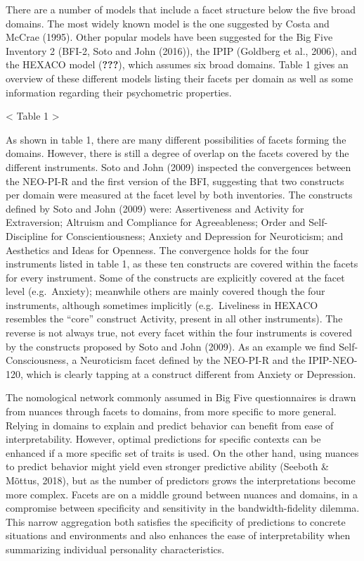 \documentclass[,man,floatsintext]{apa6}
\theoremstyle{definition}
\theoremstyle{definition}
\theoremstyle{definition}
\theoremstyle{remark}
\begin{document}
There are a number of models that include a facet structure below the
five broad domains. The most widely known model is the one suggested by
Costa and McCrae (1995). Other popular models have been suggested for
the Big Five Inventory 2 (BFI-2, Soto and John (2016)), the IPIP
(Goldberg et al., 2006), and the HEXACO model ({\textbf{???}}), which
assumes six broad domains. Table 1 gives an overview of these different
models listing their facets per domain as well as some information
regarding their psychometric properties.

\textless{} Table 1 \textgreater{}

As shown in table 1, there are many different possibilities of facets
forming the domains. However, there is still a degree of overlap on the
facets covered by the different instruments. Soto and John (2009)
inspected the convergences between the NEO-PI-R and the first version of
the BFI, suggesting that two constructs per domain were measured at the
facet level by both inventories. The constructs defined by Soto and John
(2009) were: Assertiveness and Activity for Extraversion; Altruism and
Compliance for Agreeableness; Order and Self-Discipline for
Conscientiousness; Anxiety and Depression for Neuroticism; and
Aesthetics and Ideas for Openness. The convergence holds for the four
instruments listed in table 1, as these ten constructs are covered
within the facets for every instrument. Some of the constructs are
explicitly covered at the facet level (e.g.~Anxiety); meanwhile others
are mainly covered though the four instruments, although sometimes
implicitly (e.g.~Liveliness in HEXACO resembles the \enquote{core}
construct Activity, present in all other instruments). The reverse is
not always true, not every facet within the four instruments is covered
by the constructs proposed by Soto and John (2009). As an example we
find Self-Consciousness, a Neuroticism facet defined by the NEO-PI-R and
the IPIP-NEO-120, which is clearly tapping at a construct different from
Anxiety or Depression.

The nomological network commonly assumed in Big Five questionnaires is
drawn from nuances through facets to domains, from more specific to more
general. Relying in domains to explain and predict behavior can benefit
from ease of interpretability. However, optimal predictions for specific
contexts can be enhanced if a more specific set of traits is used. On
the other hand, using nuances to predict behavior might yield even
stronger predictive ability (Seeboth \& Mõttus, 2018), but as the number
of predictors grows the interpretations become more complex. Facets are
on a middle ground between nuances and domains, in a compromise between
specificity and sensitivity in the bandwidth-fidelity dilemma. This
narrow aggregation both satisfies the specificity of predictions to
concrete situations and environments and also enhances the ease of
interpretability when summarizing individual personality
characteristics.
\end{document}
